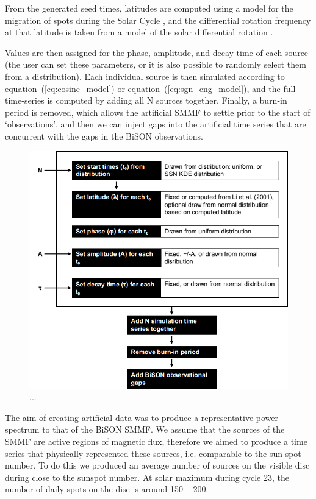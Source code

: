 From the generated seed times, latitudes are computed using a model for the migration of spots during the Solar Cycle \citep{li_latitude_2001-1}, and the differential rotation frequency at that latitude is taken from a model of the solar differential rotation \citep{snodgrass_magnetic_1983}. 

Values are then assigned for the phase, amplitude, and decay time of each source (the user can set these parameters, or it is also possible to randomly select them from a distribution). Each individual source is then simulated according to equation~(\ref{eq:cosine_model}) or equation~(\ref{eq:sgn_cng_model}), and the full time-series is computed by adding all N sources together. Finally, a burn-in period is removed, which allows the artificial SMMF to settle prior to the start of `observations', and then we can inject gaps into the artificial time series that are concurrent with the gaps in the BiSON observations.


\begin{figure}[ht!]
	\centering
	\includegraphics[width=0.85\columnwidth]{flow_chart.png}
	\caption{...}
	\label{fig:flowchart}
\end{figure}


The aim of creating artificial data was to produce a representative power spectrum to that of the BiSON SMMF. We assume that the sources of the SMMF are active regions of magnetic flux, therefore we aimed to produce a time series that physically represented these sources, i.e. comparable to the sun spot number. To do this we produced an average number of sources on the visible disc during close to the sunspot number. At solar maximum during cycle 23, the number of daily spots on the disc is around 150 -- 200. 

